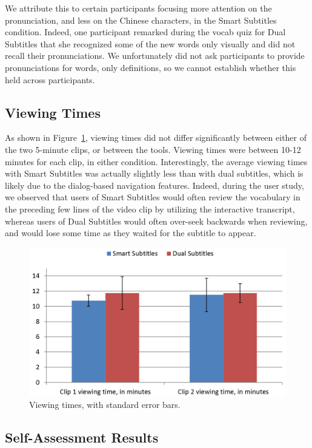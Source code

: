 \documentclass{sigchi}
\begin{document}
We attribute this to certain participants focusing more attention on the pronunciation, and less on the Chinese characters, in the Smart Subtitles condition. Indeed, one participant remarked during the vocab quiz for Dual Subtitles that she recognized some of the new words only visually and did not recall their pronunciations. We unfortunately did not ask participants to provide pronunciations for words, only definitions, so we cannot establish whether this held across participants.

\subsection{Viewing Times}

As shown in Figure~\ref{fig:figure7}, viewing times did not differ significantly between either of the two 5-minute clips, or between the tools. Viewing times were between 10-12 minutes for each clip, in either condition. Interestingly, the average viewing times with Smart Subtitles was actually slightly less than with dual subtitles, which is likely due to the dialog-based navigation features. Indeed, during the user study, we observed that users of Smart Subtitles would often review the vocabulary in the preceding few lines of the video clip by utilizing the interactive transcript, whereas users of Dual Subtitles would often over-seek backwards when reviewing, and would lose some time as they waited for the subtitle to appear.

\begin{figure}[!h]
\centering
\includegraphics[width=\columnwidth]{viewing-times}
\caption{Viewing times, with standard error bars.}
\label{fig:figure7}
\end{figure}


\subsection{Self-Assessment Results}
\end{document}
